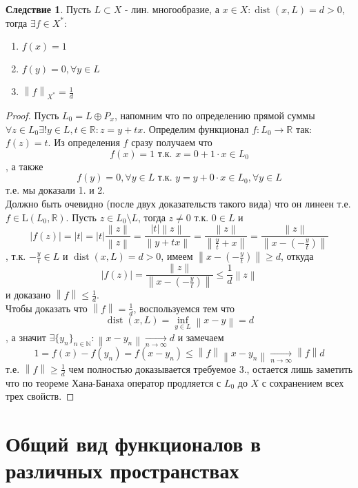 \documentclass[12pt,a4paper]{article}
\theoremstyle{definition}
\newtheorem{corollary}{Следствие}[theorem]
\newcommand{\Real}{\mathbb{R}}
\newcommand{\Natural}{\mathbb{N}}
\newcommand{\norm}[1]{\left\lVert#1\right\rVert}
\DeclareMathOperator{\dist}{dist}
\newcommand{\linear}[2]{\textrm{L}(#1, #2)}
\newcommand{\seq}[2]{\{#1\}_{#2}}
\begin{document}
\begin{corollary}\label{corll:4}
	Пусть $L\subset X$ - лин. многообразие, а $x\in X: \dist(x,L) = d > 0$, тогда $\exists f\in X^*$:
	\begin{enumerate}
		\item $f(x)=1$
		\item $f(y)=0,\forall y \in L$
		\item $\norm{f}_{X^*} = \frac{1}{d}$
	\end{enumerate}
\end{corollary}
\begin{proof}
	Пусть $L_0 = L \oplus P_{x}$, напомним что по определению прямой суммы $\forall z \in L_0 \exists!y\in L, t\in\Real: z = y + tx$. Определим функционал $f : L_0 \to \Real$ так: $f(z)=t$. Из определения $f$ сразу получаем что $$f(x)=1 \text{ т.к. } x = 0 + 1\cdot x \in L_0$$, а также $$f(y) = 0, \forall y \in L \text{ т.к. } y = y + 0\cdot x \in L_0, \forall y \in L$$ т.е. мы доказали 1. и 2. \\
	
	Должно быть очевидно (после двух доказательств такого вида) что он линеен т.е. $f\in\linear{L_0}{\Real}$. Пусть $z \in L_0 \setminus L$, тогда $z \neq 0$ т.к. $0\in L$ и 
	$$|f(z)| = |t| = 
	|t|\frac{\norm{z}}{\norm{z}} = 
	\frac{|t|\norm{z}}{\norm{y+tx}} =
	\frac{\norm{z}}{\norm{\frac{y}{t} + x}} = 
	\frac{\norm{z}}{\norm{x - (-\frac{y}{t})}}$$
	, т.к. $-\frac{y}{t} \in L$ и $\dist(x, L) = d > 0$, имеем $\norm{x - (-\frac{y}{t})} \geq d$, откуда
	$$|f(z)| = \frac{\norm{z}}{\norm{x - (-\frac{y}{t})}} \leq 
	\frac{1}{d}\norm{z}$$ и доказано $\norm{f} \leq \frac{1}{d}$. \\
	
	Чтобы доказать что $\norm{f} = \frac{1}{d}$, воспользуемся тем что $$\dist(x,L) = \inf_{y \in L}{\norm{x - y}} = d$$, а значит  $\exists\seq{y_n}{n\in\Natural}: \norm{x-y_n} \xrightarrow[n \to \infty]{} d$ и замечаем
	$$1 = f(x) - f(y_n) = f(x - y_n) \leq \norm{f}\norm{x - y_n} \xrightarrow[n \to \infty]{} \norm{f}d$$
	т.е. $\norm{f} \geq \frac{1}{d}$ чем полностью доказывается требуемое 3., остается лишь заметить что по теореме Хана-Банаха оператор продляется с $L_0$ до $X$ с сохранением всех трех свойств.
\end{proof}

\section{Общий вид функционалов в различных пространствах}
\end{document}
